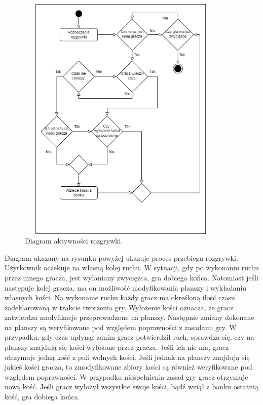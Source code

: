 \begin{figure}[h!]
	\begin{center}
		\includegraphics[width=10cm,height=12cm]{img/activity-diagram-game.png}
	\end{center}
	\caption{{\color{dgray} Diagram aktywności rozgrywki.}} 
	\label{diagram-aktywnosci-game}
\end{figure}  

Diagram ukazany na rysunku powyżej ukazuje proces przebiegu rozgrywki. Użytkownik oczekuje na własną kolej ruchu. W sytuacji, gdy po wykonaniu ruchu przez innego gracza, jest wyłaniany zwycięzca, gra dobiega końca. Natomiast jeśli następuje kolej gracza, ma on możliwość modyfikowania planszy i wykładaniu własnych kości. Na wykonanie ruchu każdy gracz ma określoną ilość czasu zadeklarowaną w trakcie tworzenia gry. Wyłożenie kości oznacza, że gracz zatwierdza modyfikacje przeprowadzone na planszy. Następnie zmiany dokonane na planszy są weryfikowane pod względem poprawności z zasadami gry. W przypadku, gdy czas upłynął zanim gracz potwierdził ruch, sprawdza się, czy na planszy znajdują się kości wyłożone przez gracza. Jeśli ich nie ma, gracz otrzymuje jedną kość z puli wolnych kości. Jeśli jednak na planszy znajdują się jakieś kości gracza, to zmodyfikowane zbiory kości są również weryfikowane pod względem poprawności. W przypadku niespełnienia zasad gry gracz otrzymuje nową kość. 
Jeśli gracz wyłożył wszystkie swoje kości, bądź wziął z banku ostatnią kość, gra dobiega końca.


